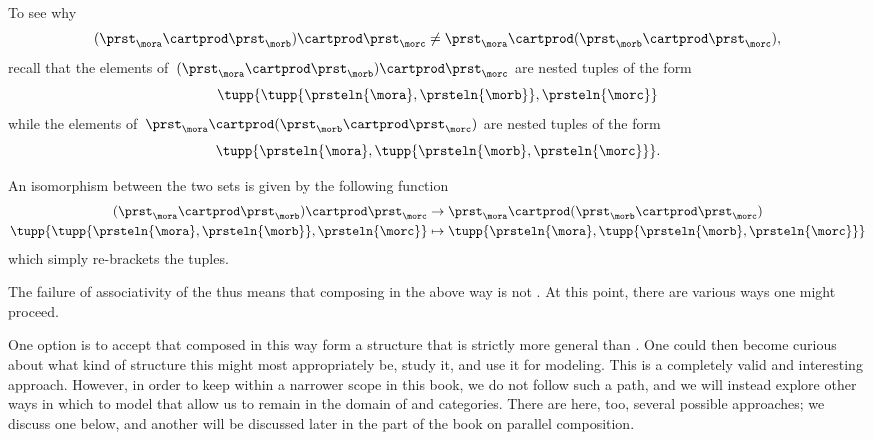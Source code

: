 To see why
\begin{equation}
    \label{eq:assoc-fails1}
    (\prst_{\mora} \cartprod \prst_{\morb}) \cartprod \prst_{\morc} \neq \prst_{\mora} \cartprod (\prst_{\morb} \cartprod \prst_{\morc}),
\end{equation}
recall that the elements of~$(\prst_{\mora} \cartprod \prst_{\morb}) \cartprod \prst_{\morc}$ are nested tuples of the form
\begin{equation}
    \tupp{ \tupp{\prsteln{\mora}, \prsteln{\morb}}, \prsteln{\morc} }
\end{equation}
while the elements of~$\prst_{\mora} \cartprod (\prst_{\morb} \cartprod \prst_{\morc})$ are nested tuples of the form
\begin{equation}
    \tupp{\prsteln{\mora}, \tupp{\prsteln{\morb}, \prsteln{\morc}} }.
\end{equation}

An isomorphism between the two sets is given by the following function
\begin{equation}
    \label{eq:assoc-fails2}
    \begin{aligned}
        (\prst_{\mora} \cartprod \prst_{\morb})
        \cartprod \prst_{\morc}                                           & \to \prst_{\mora} \cartprod (\prst_{\morb} \cartprod \prst_{\morc}) \\
        \tupp{ \tupp{\prsteln{\mora}, \prsteln{\morb}}, \prsteln{\morc} } & \mapsto \tupp{\prsteln{\mora}, \tupp{\prsteln{\morb}, \prsteln{\morc}} }
    \end{aligned}
\end{equation}
which simply re-brackets the tuples.

The failure of associativity of the  thus means that composing  in the above way is not .
At this point, there are various ways one might proceed.

One option is to accept that  composed in this way form a structure that is strictly more general than .
One could then become curious about what kind of structure this might most appropriately be, study it, and use it for modeling.
This is a completely valid and interesting approach.
However, in order to keep within a narrower scope in this book, we do not follow such a path, and we will instead explore other ways in which to model  that allow us to remain in the domain of  and categories.
There are here, too, several possible approaches; we discuss one below, and another will be discussed later in the part of the book on parallel composition.

